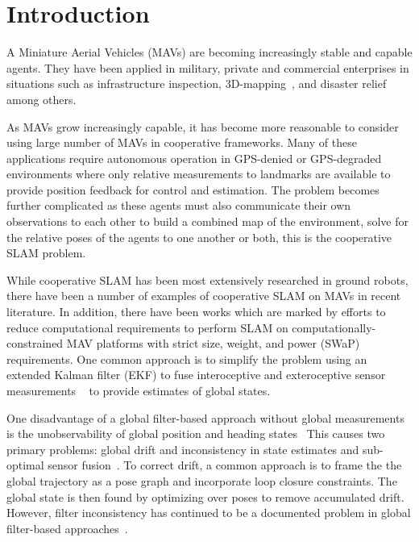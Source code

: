 
\section{Introduction}
A Miniature Aerial Vehicles (MAVs) are becoming increasingly stable and capable agents. They have been applied in military, private and commercial enterprises in situations such as infrastructure inspection\cite{Steich2016, Ham2016}, 3D-mapping~\cite{Remondino2011}, and disaster relief\cite{Adams2011} among others.

As MAVs grow increasingly capable, it has become more reasonable to consider using large number of MAVs in cooperative frameworks. Many of these applications require autonomous operation in GPS-denied or GPS-degraded environments where only relative measurements to landmarks are available to provide position feedback for control and estimation.  The problem becomes further complicated as these agents must also communicate their own observations to each other to build a combined map of the environment, solve for the relative poses of the agents to one another or both, this is the cooperative SLAM problem.

While cooperative SLAM has been most extensively researched in ground robots, there have been a number of examples of cooperative SLAM on MAVs in recent literature\cite{Loianno2015, Achtelik2012, Lawson2015}. In addition, there have been works which are marked by efforts to reduce computational requirements to perform SLAM on computationally-constrained MAV platforms with strict size, weight, and power (SWaP) requirements.  One common approach is to simplify the problem using an extended Kalman filter (EKF) to fuse interoceptive and exteroceptive sensor measurements
~\cite{Bachrach2010a, Wheeler2017b, Achtelik2009, Ahrens2009, Chowdary2013} to provide estimates of global states.

One disadvantage of a global filter-based approach without global measurements is the unobservability of global position and heading states~\cite{Martinelli2012,Weiss2012,Jones2007} This causes two primary problems: global drift and inconsistency in state estimates and sub-optimal sensor fusion~\cite{Bailey2006Consistency,Bar-Shalom2002}. To correct drift, a common approach is to frame the the global trajectory as a pose graph and incorporate loop closure constraints.  The global state is then found by optimizing over poses to remove accumulated drift.  However, filter inconsistency has continued to be a documented problem in global filter-based approaches~\cite{Wheeler2017a}.

